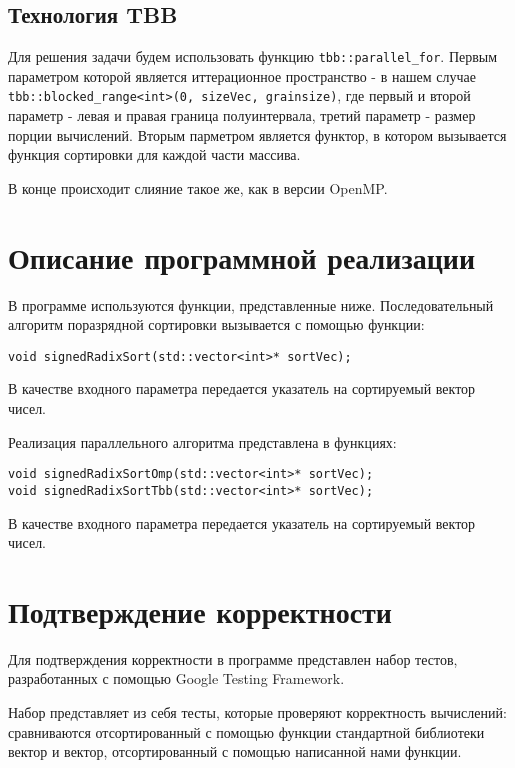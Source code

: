\documentclass{report}
\begin{document}
\subsection*{Технология TBB}
Для решения задачи будем использовать функцию \verb|tbb::parallel_for|. Первым параметром которой является иттерационное пространство - в нашем случае \verb|tbb::blocked_range<int>(0, sizeVec, grainsize)|, где первый и второй параметр - левая и правая граница полуинтервала, третий параметр - размер порции вычислений. Вторым парметром является функтор, в котором вызывается функция сортировки для каждой части массива.
\par В конце происходит слияние такое же, как в версии OpenMP.
\newpage

\section*{Описание программной реализации}
В программе используются функции, представленные ниже.
Последовательный алгоритм поразрядной сортировки вызывается с помощью функции:
\begin{lstlisting}
void signedRadixSort(std::vector<int>* sortVec);
\end{lstlisting}
\par В качестве входного параметра передается указатель на сортируемый вектор чисел.
\par Реализация параллельного алгоритма представлена в функциях:
\begin{lstlisting}
void signedRadixSortOmp(std::vector<int>* sortVec);
void signedRadixSortTbb(std::vector<int>* sortVec);
\end{lstlisting}
\par В качестве входного параметра передается указатель на сортируемый вектор чисел.

\newpage

\section*{Подтверждение корректности}
Для подтверждения корректности в программе представлен набор тестов, разработанных с помощью Google Testing Framework.
\par Набор представляет из себя тесты, которые проверяют корректность вычислений: сравниваются отсортированный с помощью функции стандартной библиотеки вектор и вектор, отсортированный с помощью написанной нами функции.
\end{document}
